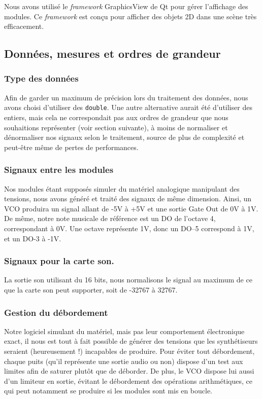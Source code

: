 Nous avons utilisé le \emph{framework} GraphicsView de Qt pour
gérer l'affichage des modules. Ce \emph{framework} est conçu pour
afficher des objets 2D dans une scène très efficacement.


\subsection{Données, mesures et ordres de grandeur}

\subsubsection{Type des données}

Afin de garder un maximum de précision lors du traitement des
données, nous avons choisi d'utiliser des \verb!double!. Une autre
alternative aurait été d'utiliser des entiers, mais cela ne
correspondait pas aux ordres de grandeur que nous souhaitions
représenter (voir section suivante), à moins de normaliser et
dénormaliser nos signaux selon le traitement, source de plus de
complexité et peut-être même de pertes de performances.

\subsubsection{Signaux entre les modules}

Nos modules étant supposés simuler du matériel analogique
manipulant des tensions, nous avons généré et traité des signaux de
même dimension. Ainsi, un VCO produira un signal allant de -5V à
+5V et une sortie Gate Out de 0V à 1V. De même, notre note musicale
de référence est un DO de l'octave 4, correspondant à 0V. Une
octave représente 1V, donc un DO--5 correspond à 1V, et un DO-3 à
-1V.

\subsubsection{Signaux pour la carte son.}

La sortie son utilisant du 16 bits, nous normalisons le signal au
maximum de ce que la carte son peut supporter, soit de -32767 à
32767.

\subsubsection{Gestion du débordement}

Notre logiciel simulant du matériel, mais pas leur comportement
électronique exact, il nous est tout à fait possible de générer des
tensions que les synthétiseurs seraient (heureusement !) incapables
de produire. Pour éviter tout débordement, chaque puits (qu'il
représente une sortie audio ou non) dispose d'un test aux limites afin de saturer
plutôt que de déborder. De plus, le VCO dispose lui aussi d'un
limiteur en sortie, évitant le débordement des opérations
arithmétiques, ce qui peut notamment se produire si les modules sont mis en boucle.

